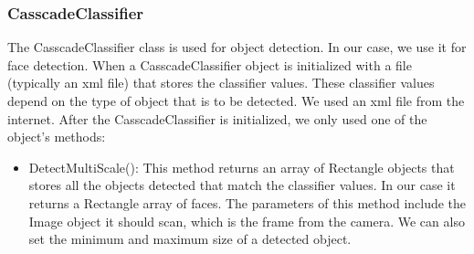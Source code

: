 \documentclass[12pt, a4paper]{article}
\begin{document}
\subsubsection{CasscadeClassifier} The CasscadeClassifier class is used for object detection. In our case, we use it for face detection. When a CasscadeClassifier object is initialized with a file (typically an xml file) that stores the classifier values. These classifier values depend on the type of object that is to be detected. We used an xml file from the internet. After the CasscadeClassifier is initialized, we only used one of the object’s methods:
\begin{itemize}
\item DetectMultiScale(): This method returns an array of Rectangle objects that stores all the objects detected that match the classifier values. In our case it returns a Rectangle array of faces. The parameters of this method include the Image object it should scan, which is the frame from the camera. We can also set the minimum and maximum size of a detected object.
\end{itemize}
\end{document}
